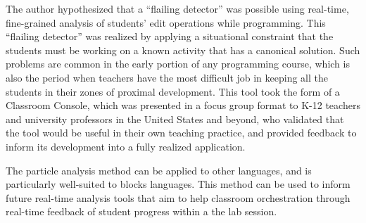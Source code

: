 The author hypothesized that a ``flailing detector'' was possible using real-time, fine-grained analysis of students' edit operations while programming. This ``flailing detector'' was realized by applying a situational constraint that the students must be working on a known activity that has a canonical solution. Such problems are common in the early portion of any programming course, which is also the period when teachers have the most difficult job in keeping all the students in their zones of proximal development. This tool took the form of a Classroom Console, which was presented in a focus group format to K-12 teachers and university professors in the United States and beyond, who validated that the tool would be useful in their own teaching practice, and provided feedback to inform its development into a fully realized application.

The particle analysis method can be applied to other languages, and is particularly well-suited to blocks languages. This method can be used to inform future real-time analysis tools that aim to help classroom orchestration through real-time feedback of student progress within a the lab session.

